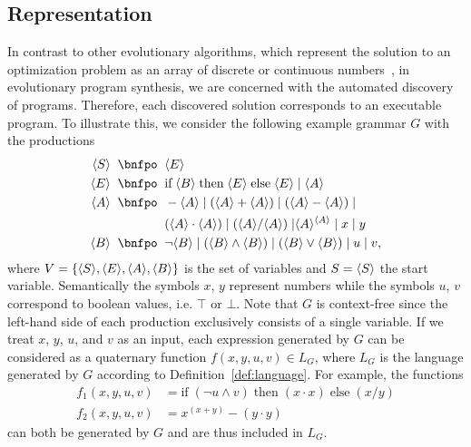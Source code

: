 \subsection{Representation}\label{sec:gggp-representation}
In contrast to other evolutionary algorithms, which represent the solution to an optimization problem as an array of discrete or continuous numbers~\cite{back1997handbook}, in evolutionary program synthesis, we are concerned with the automated discovery of programs. Therefore, each discovered solution corresponds to an executable program.
To illustrate this, we consider the following example grammar $G$ with the productions
\begin{equation}
	\begin{split}
		\ps S \; \; \bnfpo & \; \; \ps E \\
		\ps E \; \; \bnfpo & \; \; \text{if} \; \ps B \; \text{then} \; \ps E \; \text{else} \; \ps E \; | \; \ps A \\
		\ps A \; \; \bnfpo & \; \; -\ps A \; | \; (\ps A + \ps A) \; | \; (\ps A - \ps A) \; | \\
		 & \; \; (\ps A \cdot \ps A) \; | \; (\ps A / \ps A) \; | \ps{A}^{\ps{A}} \; | \; x \; | \; y \\  
		\ps B \; \; \bnfpo & \; \;  \neg \ps B \; | \; (\ps B \wedge \ps B) \; | \; (\ps B \vee \ps B) \; | \; u \; | \; v,
	\end{split}
\label{eq:gp-example-grammar}
\end{equation}
where $V = \{\langle S \rangle, \langle E \rangle, \langle A \rangle, \langle B \rangle\}$ is the set of variables and $S = \langle S \rangle$ the start variable.
Semantically the symbols $x$, $y$ represent numbers while the symbols $u$, $v$ correspond to boolean values, i.e. $\top$ or $\bot$.
Note that $G$ is context-free since the left-hand side of each production exclusively consists of a single variable.
If we treat $x$, $y$, $u$, and $v$ as an input, each expression generated by $G$ can be considered as a quaternary function $f(x,y,u,v) \in L_{G}$, where $L_G$ is the language generated by $G$ according to Definition~\ref{def:language}.
For example, the functions
\begin{equation}
	\begin{split}
		f_1(x,y,u,v) & = \text{if} \; (\neg u \wedge v) \; \text{then} \; (x \cdot x) \; \text{else} \; (x / y) \\
		f_2(x,y,u,v) & = x^{(x + y)} - (y \cdot y)
	\end{split}
\label{eq:gp-example-functions}
\end{equation} can both be generated by $G$ and are thus included in $L_G$.
